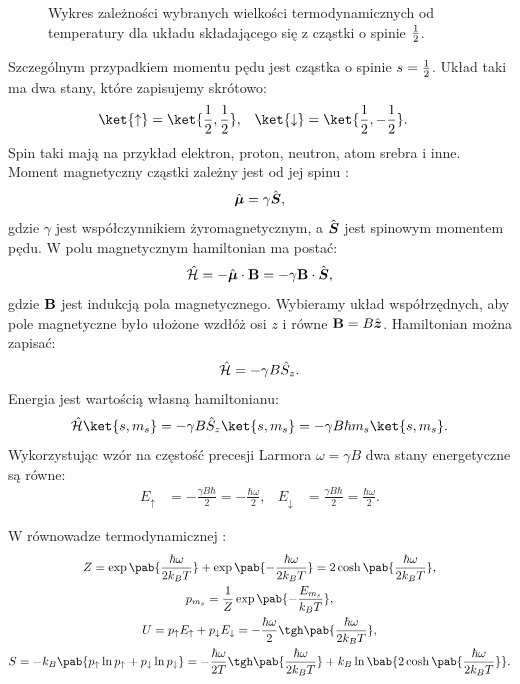 \begin{figure}[!ht]
	\centering
	
	\caption{Wykres zależności wybranych wielkości termodynamicznych od temperatury dla układu składającego się z cząstki o spinie \(\frac{1}{2}\).}
	\label{fig:wykres_spin}
\end{figure}

Szczególnym przypadkiem momentu pędu jest cząstka o spinie \(s = \frac{1}{2}\). Układ taki ma dwa stany, które zapisujemy skrótowo:
\begin{align}
	\ket{\uparrow} &= \ket{\inv{2},\inv{2}}, &
	\ket{\downarrow} &= \ket{\inv{2},-\inv{2}}.
\end{align}
Spin taki mają na przykład elektron, proton, neutron, atom srebra i inne. Moment magnetyczny cząstki zależny jest od jej spinu \cite{griffiths_kwant}:
\begin{equation}
	\vu{\mu} = \gamma \vu{S},
\end{equation}
gdzie \(\gamma\) jest współczynnikiem żyromagnetycznym, a \(\vu{S}\) jest spinowym momentem pędu. W polu magnetycznym hamiltonian ma postać:
\begin{equation}\label{eq:def_hamiltonian_magnetyczny}
	\ham = - \vu{\mu} \cdot \vb{B} = - \gamma \vb{B} \cdot \vu{S},
\end{equation}
gdzie \(\vb{B}\) jest indukcją pola magnetycznego. Wybieramy układ współrzędnych, aby pole magnetyczne było ułożone wzdłóż osi \(z\) i równe \(\vb{B} = B \vu{z}\). Hamiltonian można zapisać:
\begin{equation}
	\hat{\mathcal{H}} = - \gamma B \hat{S}_z.
\end{equation}
Energia jest wartością własną hamiltonianu:
\begin{equation}
	\ham \ket{s,m_s} =
	- \gamma B \hat{S}_z \ket{s,m_s} =
	- \gamma B \hbar m_s \ket{s,m_s}.
\end{equation}
Wykorzystując wzór na częstość precesji Larmora \(\omega = \gamma B\) dwa stany energetyczne są równe:
\begin{align}\label{eq:spin_pol_E}
	E_{\uparrow}   &= - \frac{\gamma B \hbar}{2} = - \frac{\hbar\omega}{2}, &
	E_{\downarrow} &=   \frac{\gamma B \hbar}{2} =   \frac{\hbar\omega}{2}.
\end{align}

W równowadze termodynamicznej \cite{kieu, yuan}:
\begin{gather}
	Z = \exp\pab{\frac{\hbar\omega}{2 k_B T}} + \exp\pab{-\frac{\hbar\omega}{2 k_B T}} = 2\cosh\pab{\frac{\hbar\omega}{2 k_B T}}, \label{eq:spin_pol_Z} \\
	p_{m_s} = \inv{Z} \exp\pab{-\frac{E_{m_s}}{k_B T}}, \label{eq:spin_pol_pk} \\
	U = p_{\uparrow}E_{\uparrow} + p_{\downarrow}E_{\downarrow} = - \frac{\hbar\omega}{2} \tgh\pab{\frac{\hbar\omega}{2 k_B T}}, \label{eq:spin_pol_U} \\
	S = -k_B\pab{p_{\uparrow} \ln p_{\uparrow} + p_{\downarrow} \ln p_{\downarrow}} =
	- \frac{\hbar\omega}{2T} \tgh\pab{\frac{\hbar\omega}{2 k_B T}} + k_B \ln\bab{2\cosh\pab{\frac{\hbar\omega}{2 k_B T}}}. \label{eq:spin_pol_S}
\end{gather}
